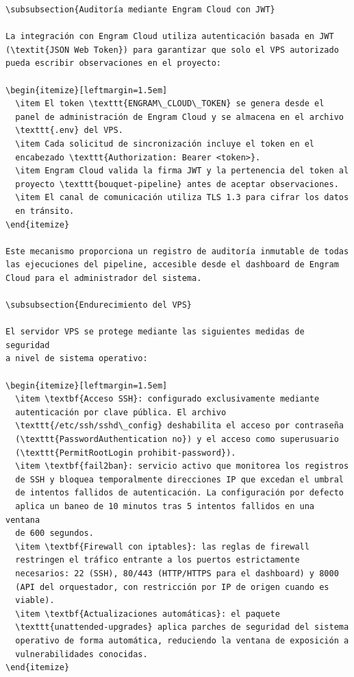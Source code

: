 \begin{verbatim}
\subsubsection{Auditoría mediante Engram Cloud con JWT}

La integración con Engram Cloud utiliza autenticación basada en JWT
(\textit{JSON Web Token}) para garantizar que solo el VPS autorizado
pueda escribir observaciones en el proyecto:

\begin{itemize}[leftmargin=1.5em]
  \item El token \texttt{ENGRAM\_CLOUD\_TOKEN} se genera desde el
  panel de administración de Engram Cloud y se almacena en el archivo
  \texttt{.env} del VPS.
  \item Cada solicitud de sincronización incluye el token en el
  encabezado \texttt{Authorization: Bearer <token>}.
  \item Engram Cloud valida la firma JWT y la pertenencia del token al
  proyecto \texttt{bouquet-pipeline} antes de aceptar observaciones.
  \item El canal de comunicación utiliza TLS 1.3 para cifrar los datos
  en tránsito.
\end{itemize}

Este mecanismo proporciona un registro de auditoría inmutable de todas
las ejecuciones del pipeline, accesible desde el dashboard de Engram
Cloud para el administrador del sistema.

\subsubsection{Endurecimiento del VPS}

El servidor VPS se protege mediante las siguientes medidas de seguridad
a nivel de sistema operativo:

\begin{itemize}[leftmargin=1.5em]
  \item \textbf{Acceso SSH}: configurado exclusivamente mediante
  autenticación por clave pública. El archivo
  \texttt{/etc/ssh/sshd\_config} deshabilita el acceso por contraseña
  (\texttt{PasswordAuthentication no}) y el acceso como superusuario
  (\texttt{PermitRootLogin prohibit-password}).
  \item \textbf{fail2ban}: servicio activo que monitorea los registros
  de SSH y bloquea temporalmente direcciones IP que excedan el umbral
  de intentos fallidos de autenticación. La configuración por defecto
  aplica un baneo de 10 minutos tras 5 intentos fallidos en una ventana
  de 600 segundos.
  \item \textbf{Firewall con iptables}: las reglas de firewall
  restringen el tráfico entrante a los puertos estrictamente
  necesarios: 22 (SSH), 80/443 (HTTP/HTTPS para el dashboard) y 8000
  (API del orquestador, con restricción por IP de origen cuando es
  viable).
  \item \textbf{Actualizaciones automáticas}: el paquete
  \texttt{unattended-upgrades} aplica parches de seguridad del sistema
  operativo de forma automática, reduciendo la ventana de exposición a
  vulnerabilidades conocidas.
\end{itemize}


\end{verbatim}
